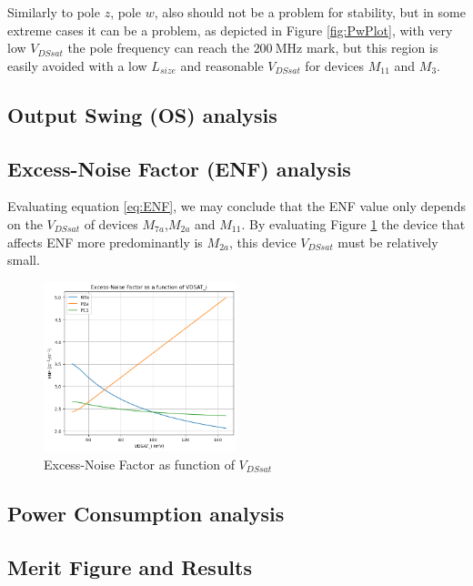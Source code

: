 Similarly to pole $z$, pole $w$, also should not be a problem for stability, but in some extreme cases it can be a problem, as depicted in Figure \ref{fig:PwPlot}, with very low $V_{DSsat}$ the pole frequency can reach the $\SI{200}{\mega\hertz}$ mark, but this region is easily avoided with a low $L_{size}$ and reasonable $V_{DSsat}$ for devices $M_{11}$ and $M_3$.

\subsection{Output Swing (OS) analysis}

\subsection{Excess-Noise Factor (ENF) analysis}

Evaluating equation \ref{eq:ENF}, we may conclude that the ENF value only depends on the $V_{DSsat}$ of devices $M_{7a}$,$M_{2a}$ and $M_{11}$. By evaluating Figure \ref{fig:enfVariation} the device that affects ENF more predominantly is $M_{2a}$, this device $V_{DSsat}$ must be relatively small.

\begin{figure}[H]
    \centering
    \includegraphics[width=0.5\textwidth]{Images/enfVariation.png}
    \caption{Excess-Noise Factor as function of $V_{DSsat}$}
    \label{fig:enfVariation}
\end{figure}

\subsection{Power Consumption analysis}

\subsection{Merit Figure and Results}

